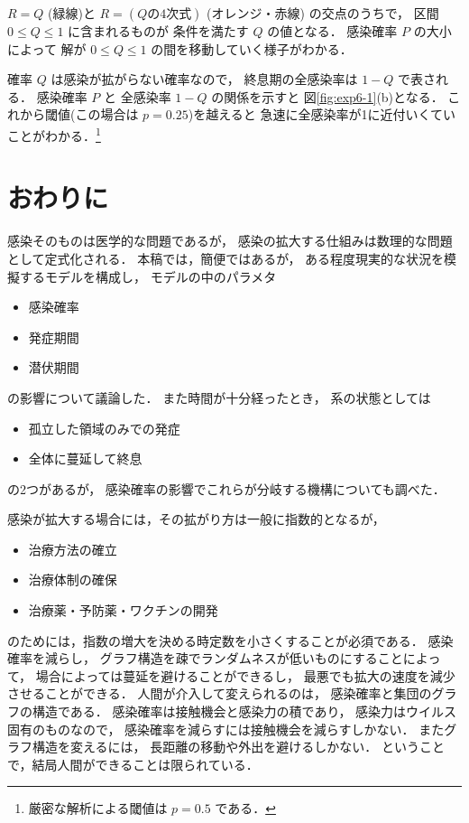 \documentclass[10pt,oneside,fleqn]{scrartcl}
\begin{document}
\(R=Q\) (緑線)と
\(R=(Q\text{の4次式})\) (オレンジ・赤線)
の交点のうちで，
区間 \(0\le Q\le 1\) に含まれるものが
条件を満たす \(Q\) の値となる．
感染確率 \(P\) の大小によって
解が \(0\le Q\le 1\) の間を移動していく様子がわかる．

確率 \(Q\) は感染が拡がらない確率なので，
終息期の全感染率は \(1-Q\) で表される．
感染確率 \(P\) と 
全感染率 \(1-Q\) の関係を示すと
図\ref{fig:exp6-1}(b)となる．
これから閾値(この場合は \(p=0.25\))を越えると
急速に全感染率が1に近付いくていことがわかる．\footnote{厳密な解析による閾値は \(p=0.5\) である．}

\section{おわりに}
\label{sec:org94f4b7d}

感染そのものは医学的な問題であるが，
感染の拡大する仕組みは数理的な問題として定式化される．
本稿では，簡便ではあるが，
ある程度現実的な状況を模擬するモデルを構成し，
モデルの中のパラメタ
\begin{itemize}
\item 感染確率
\item 発症期間
\item 潜伏期間
\end{itemize}
の影響について議論した．
また時間が十分経ったとき，
系の状態としては
\begin{itemize}
\item 孤立した領域のみでの発症
\item 全体に蔓延して終息
\end{itemize}
の2つがあるが，
感染確率の影響でこれらが分岐する機構についても調べた．

感染が拡大する場合には，その拡がり方は一般に指数的となるが，
\begin{itemize}
\item 治療方法の確立
\item 治療体制の確保
\item 治療薬・予防薬・ワクチンの開発
\end{itemize}
のためには，指数の増大を決める時定数を小さくすることが必須である．
感染確率を減らし，
グラフ構造を疎でランダムネスが低いものにすることによって，
場合によっては蔓延を避けることができるし，
最悪でも拡大の速度を減少させることができる．
人間が介入して変えられるのは，
感染確率と集団のグラフの構造である．
感染確率は接触機会と感染力の積であり，
感染力はウイルス固有のものなので，
感染確率を減らすには接触機会を減らすしかない．
またグラフ構造を変えるには，
長距離の移動や外出を避けるしかない．
ということで，結局人間ができることは限られている．
\end{document}
